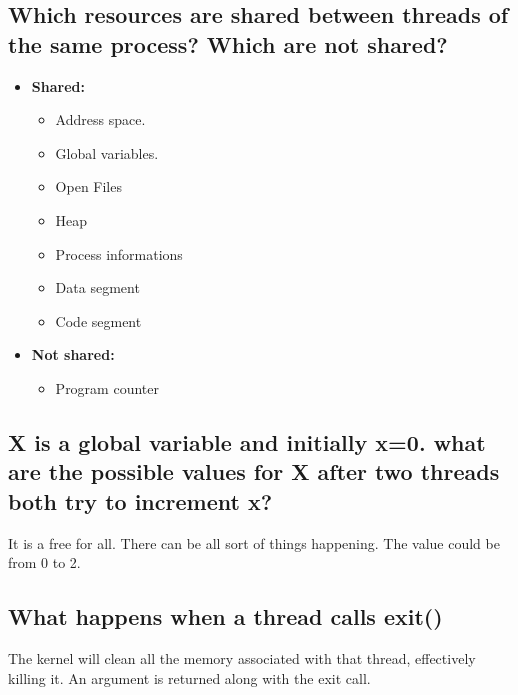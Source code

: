 \documentclass[a4paper]{article}
\begin{document}
\subsection{Which resources are shared between threads of the same process? Which are not shared?} %
\label{sub:Which resources are shared between threads of the same process? WHich are not shared?}
\begin{itemize}
  \item {\bf Shared:}
    \begin{itemize}
      \item Address space.
      \item Global variables.
      \item Open Files
      \item Heap
      \item Process informations
      \item Data segment
      \item Code segment
    \end{itemize}
  \item {\bf Not shared:}
    \begin{itemize}
      \item Program counter
    \end{itemize}
\end{itemize}
\subsection{X is a global variable and initially x=0. what are the possible values for X after two threads both try to increment x?} %
\label{sub:X is a global variable and initially x=0. what are hte possible values for X after two threads both try to increment x?}
It is a free for all. There can be all sort of things happening. The value could be from 0 to 2.
\subsection{What happens when a thread calls exit()} %
\label{sub:What happens when a thread calls exit()}
The kernel will clean all the memory associated with that thread, effectively killing it. An argument is returned along with the
exit call.
\end{document}
